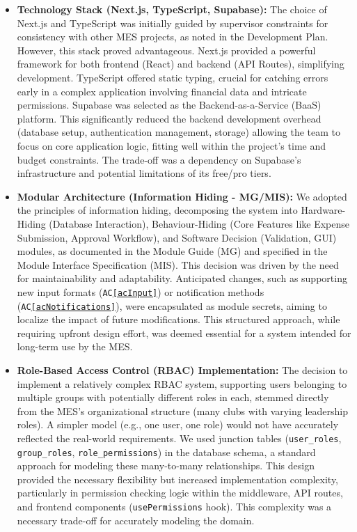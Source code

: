 \documentclass{article}
\begin{document}
\begin{itemize}
    \item \textbf{Technology Stack (Next.js, TypeScript, Supabase):}
        The choice of Next.js and TypeScript was initially guided by supervisor constraints for consistency with other MES projects, as noted in the Development Plan. However, this stack proved advantageous. Next.js provided a powerful framework for both frontend (React) and backend (API Routes), simplifying development. TypeScript offered static typing, crucial for catching errors early in a complex application involving financial data and intricate permissions. Supabase was selected as the Backend-as-a-Service (BaaS) platform. This significantly reduced the backend development overhead (database setup, authentication management, storage) allowing the team to focus on core application logic, fitting well within the project's time and budget constraints. The trade-off was a dependency on Supabase's infrastructure and potential limitations of its free/pro tiers.

    \item \textbf{Modular Architecture (Information Hiding - MG/MIS):}
        We adopted the principles of information hiding, decomposing the system into Hardware-Hiding (Database Interaction), Behaviour-Hiding (Core Features like Expense Submission, Approval Workflow), and Software Decision (Validation, GUI) modules, as documented in the Module Guide (MG) and specified in the Module Interface Specification (MIS). This decision was driven by the need for maintainability and adaptability. Anticipated changes, such as supporting new input formats (\texttt{AC\ref{acInput}}) or notification methods (\texttt{AC\ref{acNotifications}}), were encapsulated as module secrets, aiming to localize the impact of future modifications. This structured approach, while requiring upfront design effort, was deemed essential for a system intended for long-term use by the MES.

    \item \textbf{Role-Based Access Control (RBAC) Implementation:}
        The decision to implement a relatively complex RBAC system, supporting users belonging to multiple groups with potentially different roles in each, stemmed directly from the MES's organizational structure (many clubs with varying leadership roles). A simpler model (e.g., one user, one role) would not have accurately reflected the real-world requirements. We used junction tables (\texttt{user\_roles}, \texttt{group\_roles}, \texttt{role\_permissions}) in the database schema, a standard approach for modeling these many-to-many relationships. This design provided the necessary flexibility but increased implementation complexity, particularly in permission checking logic within the middleware, API routes, and frontend components (\texttt{usePermissions} hook). This complexity was a necessary trade-off for accurately modeling the domain.


\end{itemize}
\end{document}

